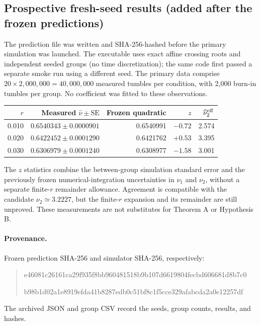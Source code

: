 \documentclass[11pt]{article}
\theoremstyle{remark}\newtheorem{remark}[theorem]{Remark}
\begin{document}
\subsection*{Prospective fresh-seed results (added after the frozen predictions)}
The prediction file was written and SHA-256-hashed before the primary simulation was launched. The executable uses exact affine crossing roots and independent seeded groups (no time discretization); the same code first passed a separate smoke run using a different seed. The primary data comprise $20\times2{,}000{,}000=40{,}000{,}000$ measured tumbles per condition, with 2,000 burn-in tumbles per group. No coefficient was fitted to these observations.
\begin{center}\small
\begin{tabular}{@{}rrrrr@{}}\toprule
$r$ & Measured $\widehat\nu\pm\mathrm{SE}$ & Frozen quadratic & $z$ & $\widehat\nu_2^{\rm eff}$\\\midrule
0.010 & $0.6540343\pm0.0000901$ & 0.6540991 & $-0.72$ & 2.574\\
0.020 & $0.6422452\pm0.0001290$ & 0.6421762 & $+0.53$ & 3.395\\
0.030 & $0.6306979\pm0.0001240$ & 0.6308977 & $-1.58$ & 3.001\\\bottomrule
\end{tabular}
\end{center}
The $z$ statistics combine the between-group simulation standard error and the previously frozen numerical-integration uncertainties in $\nu_1$ and $\nu_2$, without a separate finite-$r$ remainder allowance. Agreement is compatible with the candidate $\nu_2\simeq3.2227$, but the finite-$r$ expansion and its remainder are still unproved. These measurements are not substitutes for Theorem A or Hypothesis B.

\paragraph{Provenance.} Frozen prediction SHA-256 and simulator SHA-256, respectively:
\begin{quote}\footnotesize\ttfamily
 e46081c26161ca29f935f8bb960481518b9b107d6619804fecbd606681d8b7c0\par
 b98b1d02a1e8919efda41b8287edb0c51bf8c1f5cce329afabcda2a0e12257df
\end{quote}
The archived JSON and group CSV record the seeds, group counts, results, and hashes.
\end{document}
